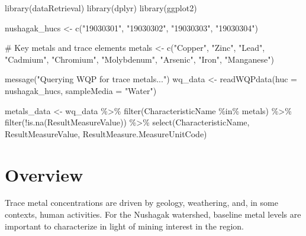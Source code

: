 \documentclass[
  letterpaper,
]{scrbook}
\newenvironment{Shaded}{\begin{snugshade}}{\end{snugshade}}
\newcommand{\AttributeTok}[1]{\textcolor[rgb]{0.40,0.45,0.13}{#1}}
\newcommand{\CommentTok}[1]{\textcolor[rgb]{0.37,0.37,0.37}{#1}}
\newcommand{\FunctionTok}[1]{\textcolor[rgb]{0.28,0.35,0.67}{#1}}
\newcommand{\NormalTok}[1]{\textcolor[rgb]{0.00,0.23,0.31}{#1}}
\newcommand{\OtherTok}[1]{\textcolor[rgb]{0.00,0.23,0.31}{#1}}
\newcommand{\SpecialCharTok}[1]{\textcolor[rgb]{0.37,0.37,0.37}{#1}}
\newcommand{\StringTok}[1]{\textcolor[rgb]{0.13,0.47,0.30}{#1}}
\begin{document}
\begin{Shaded}
\begin{Highlighting}[]
\FunctionTok{library}\NormalTok{(dataRetrieval)}
\FunctionTok{library}\NormalTok{(dplyr)}
\FunctionTok{library}\NormalTok{(ggplot2)}

\NormalTok{nushagak\_hucs }\OtherTok{\textless{}{-}} \FunctionTok{c}\NormalTok{(}\StringTok{"19030301"}\NormalTok{, }\StringTok{"19030302"}\NormalTok{, }\StringTok{"19030303"}\NormalTok{, }\StringTok{"19030304"}\NormalTok{)}

\CommentTok{\# Key metals and trace elements}
\NormalTok{metals }\OtherTok{\textless{}{-}} \FunctionTok{c}\NormalTok{(}\StringTok{"Copper"}\NormalTok{, }\StringTok{"Zinc"}\NormalTok{, }\StringTok{"Lead"}\NormalTok{, }\StringTok{"Cadmium"}\NormalTok{, }\StringTok{"Chromium"}\NormalTok{, }\StringTok{"Molybdenum"}\NormalTok{, }
            \StringTok{"Arsenic"}\NormalTok{, }\StringTok{"Iron"}\NormalTok{, }\StringTok{"Manganese"}\NormalTok{)}

\FunctionTok{message}\NormalTok{(}\StringTok{"Querying WQP for trace metals..."}\NormalTok{)}
\NormalTok{wq\_data }\OtherTok{\textless{}{-}} \FunctionTok{readWQPdata}\NormalTok{(}\AttributeTok{huc =}\NormalTok{ nushagak\_hucs, }\AttributeTok{sampleMedia =} \StringTok{"Water"}\NormalTok{)}

\NormalTok{metals\_data }\OtherTok{\textless{}{-}}\NormalTok{ wq\_data }\SpecialCharTok{\%\textgreater{}\%}
  \FunctionTok{filter}\NormalTok{(CharacteristicName }\SpecialCharTok{\%in\%}\NormalTok{ metals) }\SpecialCharTok{\%\textgreater{}\%}
  \FunctionTok{filter}\NormalTok{(}\SpecialCharTok{!}\FunctionTok{is.na}\NormalTok{(ResultMeasureValue)) }\SpecialCharTok{\%\textgreater{}\%}
  \FunctionTok{select}\NormalTok{(CharacteristicName, ResultMeasureValue, ResultMeasure.MeasureUnitCode)}
\end{Highlighting}
\end{Shaded}

\section{Overview}\label{overview-2}

Trace metal concentrations are driven by geology, weathering, and, in
some contexts, human activities. For the Nushagak watershed, baseline
metal levels are important to characterize in light of mining interest
in the region.
\end{document}
